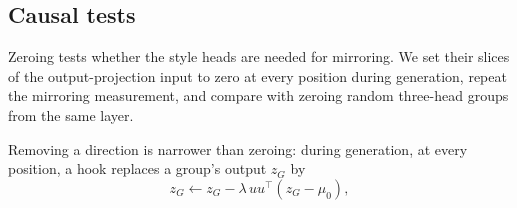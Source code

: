 \subsection{Causal tests}
\label{sec:causal}
Zeroing tests whether the style heads are needed for mirroring. We set their slices of the output-projection input to zero at every position during generation, repeat the mirroring measurement, and compare with zeroing random three-head groups from the same layer.

\label{sec:removal}
Removing a direction is narrower than zeroing: during generation, at every position, a hook replaces a group's output $z_G$ by
\begin{equation}
z_G \leftarrow z_G - \lambda\, u u^{\top} (z_G - \mu_0),
\end{equation}
